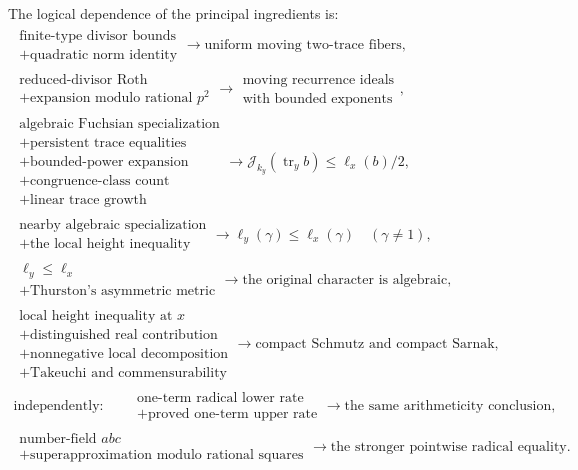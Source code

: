\documentclass[11pt,reqno]{amsart}
\theoremstyle{definition}
\theoremstyle{remark}
\newcommand{\Tr}{\operatorname{tr}}
\begin{document}
The logical dependence of the principal ingredients is:
\[
\begin{gathered}
\substack{\text{finite-type divisor bounds}\\
          +\text{quadratic norm identity}}
   \longrightarrow
   \text{uniform moving two-trace fibers},\\[2pt]
\substack{\text{reduced-divisor Roth}\\
          +\text{expansion modulo rational }p^2}
   \longrightarrow
   \substack{\text{moving recurrence ideals}\\
             \text{with bounded exponents}},\\[2pt]
\substack{\text{algebraic Fuchsian specialization}\\
          +\text{persistent trace equalities}\\
          +\text{bounded-power expansion}\\
          +\text{congruence-class count}\\
          +\text{linear trace growth}}
   \longrightarrow
   \mathcal J_{k_y}(\Tr_yb)\le\ell_x(b)/2,\\[2pt]
\substack{\text{nearby algebraic specialization}\\
          +\text{the local height inequality}}
   \longrightarrow
   \ell_y(\gamma)\le\ell_x(\gamma)\quad(\gamma\ne1),\\[2pt]
\substack{\ell_y\le\ell_x\\
          +\text{Thurston's asymmetric metric}}
   \longrightarrow
   \text{the original character is algebraic},\\[2pt]
\substack{\text{local height inequality at }x\\
          +\text{distinguished real contribution}\\
          +\text{nonnegative local decomposition}\\
          +\text{Takeuchi and commensurability}}
   \longrightarrow
   \text{compact Schmutz and compact Sarnak},\\[4pt]
\text{independently:}\qquad
\substack{\text{one-term radical lower rate}\\
          +\text{proved one-term upper rate}}
   \longrightarrow\text{the same arithmeticity conclusion},\\[2pt]
\substack{\text{number-field \(abc\)}\\
          +\text{superapproximation modulo rational squares}}
   \longrightarrow\text{the stronger pointwise radical equality}.
\end{gathered}
\tag{16.1}
\]
\end{document}

